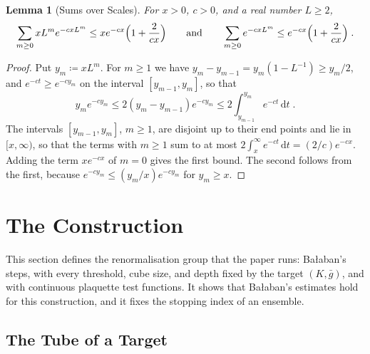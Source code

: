 \documentclass[11pt]{preprint}
\newcommand{\dd}{\mathrm{d}}
\numberwithin{equation}{section}
\newtheorem{lemma}[theorem]{Lemma}
\theoremstyle{definition}
\theoremstyle{remark}
\theoremstyle{plain}
\begin{document}
\begin{lemma}[Sums over Scales]\label{lem:scale-sums}
For $x > 0$, $c > 0$, and a real number $L \geq 2$,
\begin{equation}\label{eq:scale-sums}
    \sum_{m \geq 0}xL^me^{-cxL^m} \leq xe^{-cx}\Bigl(1 + \frac{2}{cx}\Bigr)
    \qquad\text{and}\qquad
    \sum_{m \geq 0}e^{-cxL^m} \leq e^{-cx}\Bigl(1 + \frac{2}{cx}\Bigr)\;.
\end{equation}
\end{lemma}

\begin{proof}
Put $y_m \coloneqq xL^m$. For $m \geq 1$ we have $y_m - y_{m-1} = y_m(1 - L^{-1}) \geq y_m/2$, and $e^{-ct} \geq e^{-cy_m}$ on the interval $[y_{m-1}, y_m]$, so that
\begin{equation}\label{eq:scale-sum-term}
    y_me^{-cy_m} \leq 2(y_m - y_{m-1})e^{-cy_m} \leq 2\int_{y_{m-1}}^{y_m}e^{-ct}\,\dd t\;.
\end{equation}
The intervals $[y_{m-1}, y_m]$, $m \geq 1$, are disjoint up to their end points and lie in $[x, \infty)$, so that the terms with $m \geq 1$ sum to at most $2\int_x^\infty e^{-ct}\,\dd t = (2/c)e^{-cx}$. Adding the term $xe^{-cx}$ of $m = 0$ gives the first bound. The second follows from the first, because $e^{-cy_m} \leq (y_m/x)e^{-cy_m}$ for $y_m \geq x$.
\end{proof}

\section{The Construction}\label{sec:construction}

This section defines the renormalisation group that the paper runs: Ba{\l}aban's steps, with every threshold, cube size, and depth fixed by the target $(K, \bar g)$, and with continuous plaquette test functions. It shows that Ba{\l}aban's estimates hold for this construction, and it fixes the stopping index of an ensemble.

\subsection{The Tube of a Target}\label{sec:tube}
\end{document}
